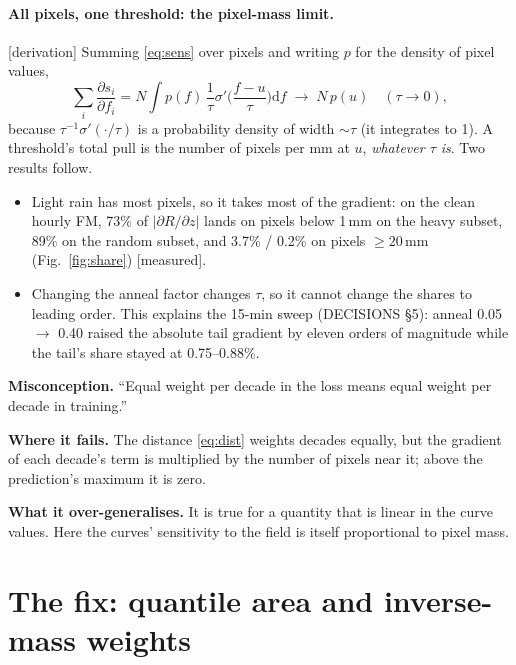 \documentclass[11pt,a4paper]{article}
\newcommand{\status}[1]{\textsf{\small[#1]}}
\newcommand{\misconception}[3]{\begin{keybox}\textbf{Misconception.} #1\par\smallskip
  \textbf{Where it fails.} #2\par\smallskip\textbf{What it over-generalises.} #3\end{keybox}}
\begin{document}
\paragraph{All pixels, one threshold: the pixel-mass limit.} \status{derivation} Summing \eqref{eq:sens} over pixels and
writing $p$ for the density of pixel values,
\begin{equation}
  \sum_i \frac{\partial s_i}{\partial f_i} = N\!\int p(f)\,\frac{1}{\tau}\sigma'\!\Big(\frac{f-u}{\tau}\Big)\mathrm df
  \;\longrightarrow\; N\,p(u)\quad (\tau\to0),
\end{equation}
because $\tau^{-1}\sigma'(\cdot/\tau)$ is a probability density of width $\sim\tau$ (it integrates to 1). A threshold's
total pull is the number of pixels per mm at $u$, \emph{whatever $\tau$ is}. Two results follow.
\begin{itemize}[nosep]
\item Light rain has most pixels, so it takes most of the gradient: on the clean hourly FM, 73\% of
$|\partial R/\partial z|$ lands on pixels below 1\,mm on the heavy subset, 89\% on the random subset, and 3.7\% /
0.2\% on pixels $\ge20$\,mm (Fig.~\ref{fig:share}) \status{measured}.
\item Changing the anneal factor changes $\tau$, so it cannot change the shares to leading order. This explains the
15-min sweep (DECISIONS \S5): anneal 0.05 $\to$ 0.40 raised the absolute tail gradient by eleven orders of magnitude
while the tail's share stayed at 0.75--0.88\%.
\end{itemize}

\misconception{``Equal weight per decade in the loss means equal weight per decade in training.''}
{The distance \eqref{eq:dist} weights decades equally, but the gradient of each decade's term is multiplied by the
number of pixels near it; above the prediction's maximum it is zero.}
{It is true for a quantity that is linear in the curve values. Here the curves' sensitivity to the field is itself
proportional to pixel mass.}

\section{The fix: quantile area and inverse-mass weights}\label{sec:fix}
\end{document}
